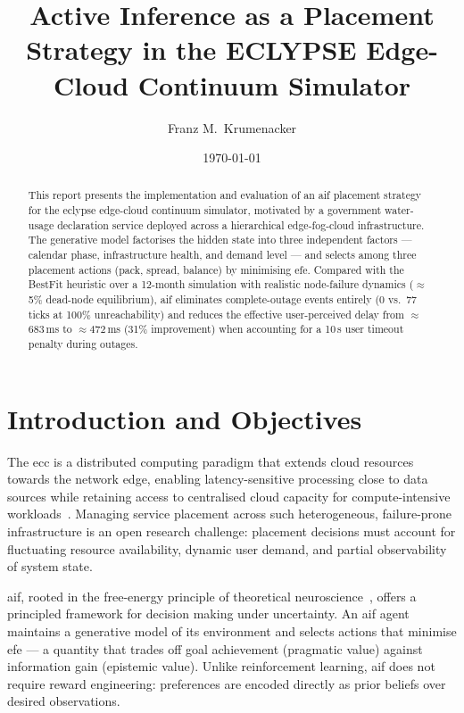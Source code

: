 \documentclass[11pt, a4paper]{article}
\title{Active Inference as a Placement Strategy in the ECLYPSE
       Edge-Cloud Continuum Simulator}
\author{Franz M.\ Krumenacker}
\date{\today}
\begin{document}
\maketitle
\tableofcontents
\newpage

\begin{abstract}
This report presents the implementation and evaluation of an
\gls{aif} placement strategy for the \gls{eclypse} edge-cloud continuum
simulator, motivated by a government water-usage declaration service deployed
across a hierarchical edge-fog-cloud infrastructure.
The generative model factorises the hidden state into three independent
factors --- calendar phase, infrastructure health, and demand level --- and
selects among three placement actions (pack, spread, balance) by minimising
\gls{efe}.
Compared with the BestFit heuristic over a 12-month simulation with realistic
node-failure dynamics ($\approx$5\% dead-node equilibrium), \gls{aif} eliminates
complete-outage events entirely (0 vs.\ 77 ticks at 100\% unreachability) and
reduces the effective user-perceived delay from $\approx$683\,ms to
$\approx$472\,ms (31\% improvement) when accounting for a 10\,s user timeout
penalty during outages.
\end{abstract}

\printglossary[type=\acronymtype, title=Acronyms]
\printglossary[title=Glossary]
\newpage

\section{Introduction and Objectives}
\label{sec:intro}

The \gls{ecc} is a distributed computing paradigm that extends cloud resources
towards the network edge, enabling latency-sensitive processing close to data
sources while retaining access to centralised cloud capacity for
compute-intensive workloads~\cite{eclypse}.
Managing service placement across such heterogeneous, failure-prone
infrastructure is an open research challenge: placement decisions must account
for fluctuating resource availability, dynamic user demand, and partial
observability of system state.

\Gls{aif}, rooted in the free-energy principle of theoretical
neuroscience~\cite{friston2017}, offers a principled framework for decision
making under uncertainty.
An \gls{aif} agent maintains a generative model of its environment and selects
actions that minimise \gls{efe} --- a quantity that trades off goal achievement
(pragmatic value) against information gain (epistemic value).
Unlike reinforcement learning, \gls{aif} does not require reward engineering:
preferences are encoded directly as prior beliefs over desired observations.
\end{document}
